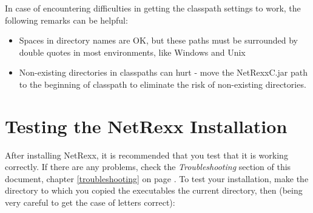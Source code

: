 In case of encountering difficulties in getting the classpath settings
to work, the following remarks can be helpful:
\begin{itemize}
\item Spaces in directory names are OK, but these paths must be
  surrounded by double quotes in most environments, like Windows and
  Unix
\item Non-existing directories in classpaths can hurt - move the
  NetRexxC.jar path to the beginning of classpath to eliminate the
  risk of non-existing directories.
\end{itemize}

\section{Testing the NetRexx Installation}\label{testing}
After installing NetRexx, it is recommended that you test that it is
working correctly. If there are any problems, check the
\emph{Troubleshooting} section of this document, chapter
\ref{troubleshooting} on page \pageref{troubleshooting}. 
To test your installation, make the directory to which you copied the executables the current directory, then (being very careful to get the case of letters correct):
